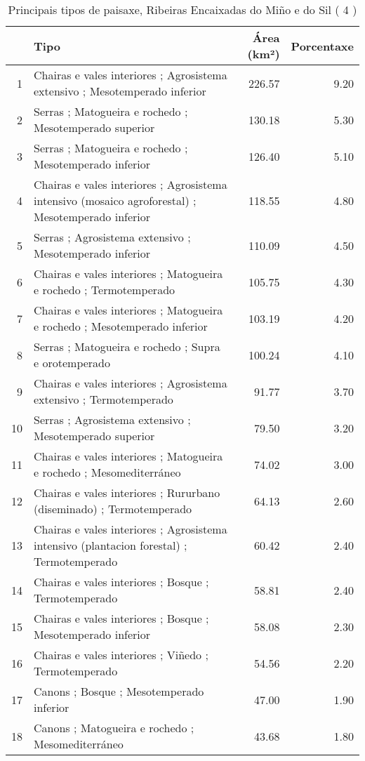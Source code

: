 \begin{table}[p]
\centering
\caption{Principais tipos de paisaxe,  Ribeiras Encaixadas do Miño e do Sil ( 4 )} 
\label{Tipos 4}
\begin{tabular}{rlrr}
  \hline
 & Tipo & Área (km²) & Porcentaxe \\ 
  \hline
1 & Chairas e vales interiores ; Agrosistema extensivo ; Mesotemperado inferior & 226.57 & 9.20 \\ 
  2 & Serras ; Matogueira e rochedo ; Mesotemperado superior & 130.18 & 5.30 \\ 
  3 & Serras ; Matogueira e rochedo ; Mesotemperado inferior & 126.40 & 5.10 \\ 
  4 & Chairas e vales interiores ; Agrosistema intensivo (mosaico agroforestal) ; Mesotemperado inferior & 118.55 & 4.80 \\ 
  5 & Serras ; Agrosistema extensivo ; Mesotemperado inferior & 110.09 & 4.50 \\ 
  6 & Chairas e vales interiores ; Matogueira e rochedo ; Termotemperado & 105.75 & 4.30 \\ 
  7 & Chairas e vales interiores ; Matogueira e rochedo ; Mesotemperado inferior & 103.19 & 4.20 \\ 
  8 & Serras ; Matogueira e rochedo ; Supra e orotemperado & 100.24 & 4.10 \\ 
  9 & Chairas e vales interiores ; Agrosistema extensivo ; Termotemperado & 91.77 & 3.70 \\ 
  10 & Serras ; Agrosistema extensivo ; Mesotemperado superior & 79.50 & 3.20 \\ 
  11 & Chairas e vales interiores ; Matogueira e rochedo ; Mesomediterráneo & 74.02 & 3.00 \\ 
  12 & Chairas e vales interiores ; Rururbano (diseminado) ; Termotemperado & 64.13 & 2.60 \\ 
  13 & Chairas e vales interiores ; Agrosistema intensivo (plantacion forestal) ; Termotemperado & 60.42 & 2.40 \\ 
  14 & Chairas e vales interiores ; Bosque ; Termotemperado & 58.81 & 2.40 \\ 
  15 & Chairas e vales interiores ; Bosque ; Mesotemperado inferior & 58.08 & 2.30 \\ 
  16 & Chairas e vales interiores ; Viñedo ; Termotemperado & 54.56 & 2.20 \\ 
  17 & Canons ; Bosque ; Mesotemperado inferior & 47.00 & 1.90 \\ 
  18 & Canons ; Matogueira e rochedo ; Mesomediterráneo & 43.68 & 1.80 \\ 

\end{tabular}
\end{table}
